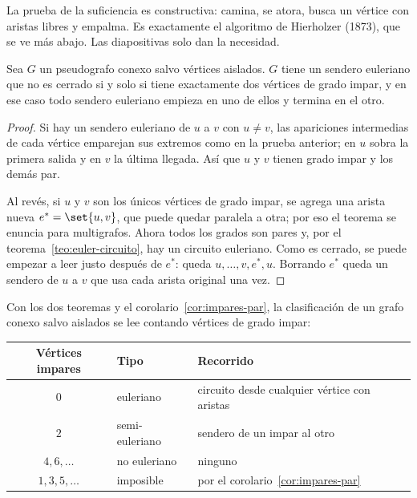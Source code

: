 \documentclass[11pt,letterpaper]{article}
\begin{document}
La prueba de la suficiencia es constructiva: camina, se atora, busca
un vértice con aristas libres y empalma. Es exactamente el algoritmo
de Hierholzer (1873), que se ve más abajo. Las diapositivas solo dan
la necesidad.

\begin{teorema}
  \label{teo:euler-sendero}
  Sea $G$ un pseudografo conexo salvo vértices aislados. $G$ tiene un
  sendero euleriano que no es cerrado si y solo si tiene exactamente
  dos vértices de grado impar, y en ese caso todo sendero euleriano
  empieza en uno de ellos y termina en el otro.
\end{teorema}

\begin{proof}
  Si hay un sendero euleriano de $u$ a $v$ con $u \neq v$, las
  apariciones intermedias de cada vértice emparejan sus extremos como
  en la prueba anterior; en $u$ sobra la primera salida y en $v$ la
  última llegada. Así que $u$ y $v$ tienen grado impar y los demás
  par.

  Al revés, si $u$ y $v$ son los únicos vértices de grado impar, se
  agrega una arista nueva $e^{*} = \set{u, v}$, que puede quedar
  paralela a otra; por eso el teorema se enuncia para multigrafos. Ahora
  todos los grados son pares y, por el teorema~\ref{teo:euler-circuito},
  hay un circuito euleriano. Como es cerrado, se puede empezar a leer
  justo después de $e^{*}$: queda $u, \dots, v, e^{*}, u$. Borrando
  $e^{*}$ queda un sendero de $u$ a $v$ que usa cada arista original
  una vez.
\end{proof}

Con los dos teoremas y el corolario~\ref{cor:impares-par}, la
clasificación de un grafo conexo salvo aislados se lee contando
vértices de grado impar:

\begin{center}
\small
\begin{tabular}{cll}
  \toprule
  \textbf{Vértices impares} & \textbf{Tipo} & \textbf{Recorrido} \\
  \midrule
  $0$ & euleriano & circuito desde cualquier vértice con aristas \\
  $2$ & semi-euleriano & sendero de un impar al otro \\
  $4, 6, \dots$ & no euleriano & ninguno \\
  $1, 3, 5, \dots$ & imposible & por el corolario~\ref{cor:impares-par}
    \\
  \bottomrule
\end{tabular}
\end{center}
\end{document}

